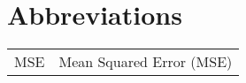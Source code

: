\chapter{Abbreviations}

\begin{table}[H]
    \centering
    \renewcommand{\arraystretch}{2}
    \begin{tabular}{ll}
		MSE & Mean Squared Error (MSE) \\
    \end{tabular}
\end{table}

\makeatletter
{}
\makeatother